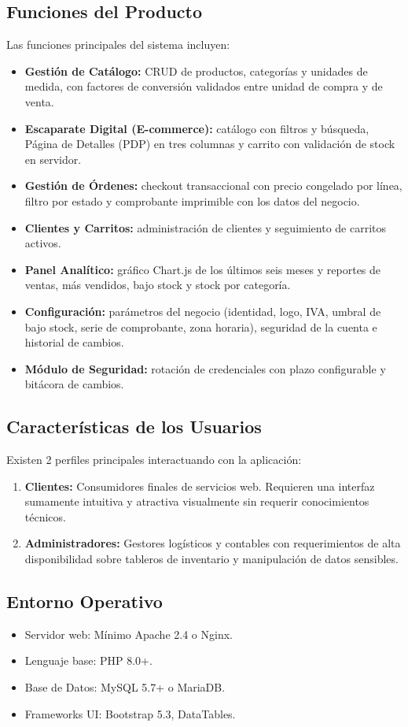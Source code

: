 \documentclass[12pt, a4paper]{article}
\begin{document}
\subsection{Funciones del Producto}
Las funciones principales del sistema incluyen:
\begin{itemize}
    \item \textbf{Gestión de Catálogo:} CRUD de productos, categorías y unidades de medida, con factores de conversión validados entre unidad de compra y de venta.
    \item \textbf{Escaparate Digital (E-commerce):} catálogo con filtros y búsqueda, Página de Detalles (PDP) en tres columnas y carrito con validación de stock en servidor.
    \item \textbf{Gestión de Órdenes:} checkout transaccional con precio congelado por línea, filtro por estado y comprobante imprimible con los datos del negocio.
    \item \textbf{Clientes y Carritos:} administración de clientes y seguimiento de carritos activos.
    \item \textbf{Panel Analítico:} gráfico Chart.js de los últimos seis meses y reportes de ventas, más vendidos, bajo stock y stock por categoría.
    \item \textbf{Configuración:} parámetros del negocio (identidad, logo, IVA, umbral de bajo stock, serie de comprobante, zona horaria), seguridad de la cuenta e historial de cambios.
    \item \textbf{Módulo de Seguridad:} rotación de credenciales con plazo configurable y bitácora de cambios.
\end{itemize}

\subsection{Características de los Usuarios}
Existen 2 perfiles principales interactuando con la aplicación:
\begin{enumerate}
    \item \textbf{Clientes:} Consumidores finales de servicios web. Requieren una interfaz sumamente intuitiva y atractiva visualmente sin requerir conocimientos técnicos.
    \item \textbf{Administradores:} Gestores logísticos y contables con requerimientos de alta disponibilidad sobre tableros de inventario y manipulación de datos sensibles.
\end{enumerate}

\subsection{Entorno Operativo}
\begin{itemize}
    \item Servidor web: Mínimo Apache 2.4 o Nginx.
    \item Lenguaje base: PHP 8.0+.
    \item Base de Datos: MySQL 5.7+ o MariaDB.
    \item Frameworks UI: Bootstrap 5.3, DataTables.
\end{itemize}
\end{document}
